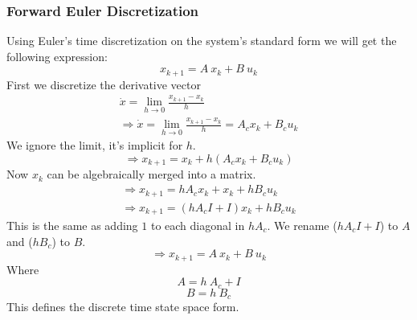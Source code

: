 \subsubsection{Forward Euler Discretization}
Using Euler's time discretization on the system's standard form we will get the following expression:
\begin{equation}
	x_{k+1} = A\ x_k + B\ u_k
\end{equation}
First we discretize the derivative vector
\begin{subequations}
\begin{align}
{\dot{x}} = \lim_{h\rightarrow 0} \frac{{x}_{k+1}-{x}_{k}}{h} \\
\Rightarrow {\dot{x}} = \lim_{h\rightarrow 0} \frac{{x}_{k+1}-{x}_{k}}{h} = {A_c} {x}_k + {B_c} u_k
\end{align}
\end{subequations}
We ignore the limit, it's implicit for $ h $.
\begin{equation}
\Rightarrow {x}_{k+1} = {x}_{k} + h({A_c} {x}_k + {B_c} u_k)
\end{equation}
Now $ {x}_k $ can be algebraically merged into a matrix.
\begin{subequations}
\begin{align}
\Rightarrow {x}_{k+1} = h{A_c} {x}_k + {x}_{k} + h{B_c} u_k \\
\Rightarrow {x}_{k+1} = (h{A_c} {I} + {I}){x}_k + h{B_c} u_k
\end{align}
\end{subequations}
This is the same as adding $ 1 $ to each diagonal in $ h{A_c} $. We rename ($hA_c{I} + {I}$) to $ {A}$ and ($h{B_c}$) to $B$.
\begin{equation} \label{mat:eq}
\Rightarrow {x}_{k+1} = {A}\ {x}_k + {B}\ u_k
\end{equation}
Where
\begin{equation}
{A} = h\ {A_c} + {I}
\end{equation}
\begin{equation}
{B} = h\ {B_c}
\end{equation}
This defines the discrete time state space form.


